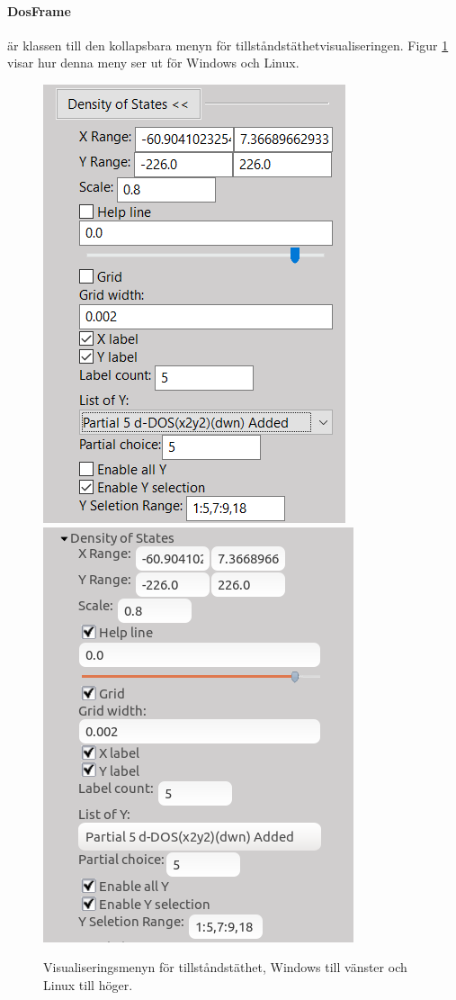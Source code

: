 \paragraph{DosFrame} är klassen till den kollapsbara menyn för tillståndstäthetvisualiseringen. Figur \ref{fig:GUIDoS} visar hur denna meny ser ut för Windows och Linux.

\begin{figure}[H]
  \centering
    \includegraphics[scale=0.5]{images/GUI/GUIDoSWin.png}
    \includegraphics[scale=0.529]{images/GUI/GUIDoSLinux.png}
    \caption{Visualiseringsmenyn för tillståndstäthet, Windows till vänster och Linux till höger.}
    \label{fig:GUIDoS}
\end{figure}

